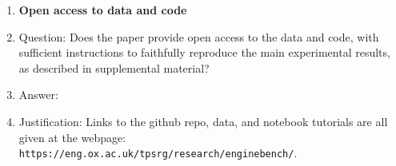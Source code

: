 \documentclass{article}
\begin{document}
\begin{enumerate}
\item {\bf Open access to data and code}
    \item[] Question: Does the paper provide open access to the data and code, with sufficient instructions to faithfully reproduce the main experimental results, as described in supplemental material?
    \item[] Answer: \answerYes{} %
    \item[] Justification: Links to the github repo, data, and notebook tutorials are all given at the webpage: \\
    \texttt{https://eng.ox.ac.uk/tpsrg/research/enginebench/}.



\end{enumerate}
\end{document}
